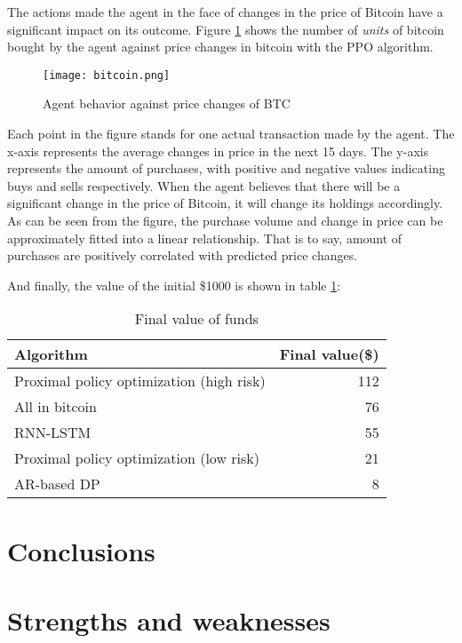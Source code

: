 \documentclass{mcmthesis}
\begin{document}
The actions made the agent in the face of changes in the price of Bitcoin have a significant impact on its outcome.
Figure \ref{BTC} shows the number of \textit{units} of bitcoin bought by the agent against price changes in bitcoin with the PPO algorithm.

\begin{figure}[h]
  \small
  \centering
  \texttt{[image: bitcoin.png]}
  \caption{Agent behavior against price changes of BTC} \label{BTC}
\end{figure}

Each point in the figure stands for one actual transaction made by the agent.
The x-axis represents the average changes in price in the next 15 days.
The y-axis represents the amount of purchases, with positive and negative values indicating buys and sells respectively.
When the agent believes that there will be a significant change in the price of Bitcoin, it will change its holdings accordingly.
As can be seen from the figure, the purchase volume and change in price can be approximately fitted into a linear relationship.
That is to say, amount of purchases are positively correlated with predicted price changes.

And finally, the value of the initial \$1000 is shown in table \ref{final-value}:

\begin{table}
  \centering
  \begin{tabular}{@{}lr@{}}
    \toprule
    Algorithm & Final value(\$) \\
    \midrule
    Proximal policy optimization (high risk) & 112 \\
    {\color{gray} All in bitcoin} & {\color{gray} 76} \\
    RNN-LSTM & 55 \\
    Proximal policy optimization (low risk) & 21 \\
    AR-based DP & 8 \\
    \bottomrule
  \end{tabular}
  \caption{Final value of funds}
  \label{final-value}
\end{table}

\section{Conclusions}
\lipsum[6]

\section{Strengths and weaknesses}
\lipsum[12]
\end{document}
